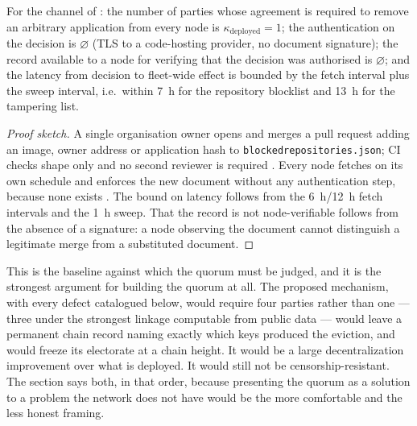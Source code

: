 \begin{property}
\label{prop:23:kappa-today}
For the channel of : the number of parties whose agreement is required
to remove an arbitrary application from every node is $\kappa_{\mathrm{deployed}} = 1$; the
authentication on the decision is $\varnothing$ (TLS to a code-hosting provider, no document
signature); the record available to a node for verifying that the decision was authorised is
$\varnothing$; and the latency from decision to fleet-wide effect is bounded by the fetch interval
plus the sweep interval, i.e.\ within \SI{7}{\hour} for the repository blocklist and \SI{13}{\hour}
for the tampering list.
\end{property}

\begin{proof}[Proof sketch]
A single organisation owner opens and merges a pull request adding an image, owner address or
application hash to \texttt{blockedrepositories.\allowbreak{}json}; CI checks shape only and no second reviewer
is required . Every node fetches on its own
schedule and enforces the new document without any authentication step, because none exists
. The bound on latency follows from the
\SI{6}{\hour}/\SI{12}{\hour} fetch intervals and the \SI{1}{\hour} sweep. That the record is not
node-verifiable follows from the absence of a signature: a node observing the document cannot
distinguish a legitimate merge from a substituted document.
\end{proof}

This is the baseline against which the quorum must be judged, and it is the strongest argument for
building the quorum at all. The proposed mechanism, with every defect catalogued below, would
require four parties rather than one --- three under the strongest linkage computable from public
data --- would leave a permanent chain record naming exactly which keys produced the eviction, and
would freeze its electorate at a chain height. It would be a large
decentralization improvement over what is deployed. It would still not be censorship-resistant.
The section says both, in that order, because presenting the quorum as a solution to a problem the
network does not have would be the more comfortable and the less honest framing.

